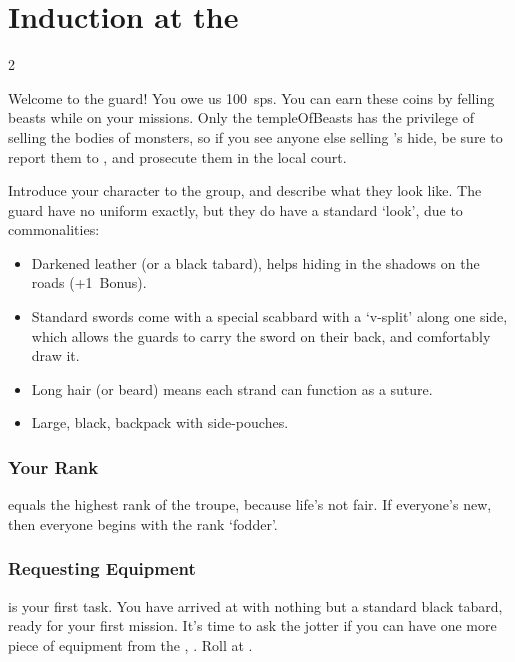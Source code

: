 \section{Induction at the }
\label{ngIntroductions}

\begin{multicols}{2}

\begin{speechtext}
  Welcome to the \gls{guard}!
  You owe us 100~\glspl{sp}.
  You can earn these coins by felling beasts while on your missions.
  Only the \gls{templeOfBeasts} has the privilege of selling the bodies of \glspl{monster}, so if you see anyone else selling 's hide, be sure to report them to , and prosecute them in the local \gls{court}.
\end{speechtext}

\noindent
Introduce your character to the group, and describe what they look like.
The \gls{guard} have no uniform exactly, but they do have a standard `look', due to commonalities:

\begin{itemize}
  \item
  Darkened leather (or a black tabard), helps hiding in the shadows on the roads (+1~Bonus).
  \item
  Standard swords come with a special scabbard with a `v-split' along one side, which allows the \glspl{guard} to carry the sword on their back, and comfortably draw it.
  \item
  Long hair (or beard) means each strand can function as a suture.
  \item
  Large, black, backpack with side-pouches.
\end{itemize}

\subsubsection{Your Rank}
\label{ngRank}
equals the highest rank of the troupe, because life's not fair.
If everyone's new, then everyone begins with the rank `\gls{fodder}'.

\subsubsection{Requesting Equipment}
is your first task.
You have arrived at  with nothing but a standard black tabard, ready for your first mission.
It's time to ask the \gls{jotter} if you can have one more piece of equipment from the , .
Roll  at \tn[7].


\end{multicols}

